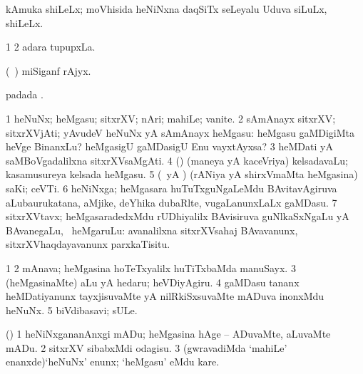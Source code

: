 {{{{{{\bentry
{} 
\gl{\nA}
\expl{}
\bmng
kAmuka shiLeLx; moVhisida heNiNxna daqSiTx seLeyalu Uduva siLuLx, shiLeLx. 
\emng
\eentry

\bentry
{} 
\gl{\nA}
\expl{}
\bmng
{} 
\emng
\eentry

\bentry
{} 
\gl{\nA}
\expl{}
\bmng
\bnum
\num{1}  
\num{2} adara tupupxLa. 
\enum
\emng
\eentry

\bentry
{} 
\gl{\nA}
\expl{}
\bmng
(\kanu\ \ame) miSiganf rAjyx. 
\emng
\eentry

\bentry
{} 
\gl{\nA}
\expl{}
\bmng
{} padada \bava. 
\emng
\eentry

\bentry
{} 
\gl{\nA}
\bmng
\bnum
\num{1} heNuNx; heMgasu; sitxrXV; nAri; mahiLe; vanite. 
\num{2} sAmAnayx sitxrXV; sitxrXVjAti; yAvudeV heNuNx yA sAmAnayx heMgasu:  heMgasu gaMDigiMta heVge BinanxLu? heMgasigU gaMDasigU Enu vayxtAyxsa? 
\num{3} heMDati yA saMBoVgadalilxna sitxrXVsaMgAti. 
\num{4} (\AmA) (maneya yA kaceVriya) kelsadavaLu; kasamusureya kelsada heMgasu. 
\num{5} (\ca\ yA \pArxparx) (rANiya yA shirxVmaMta heMgasina) saKi; ceVTi. 
\num{6} heNiNxga; heMgasara huTuTxguNgaLeMdu BAvitavAgiruva aLubaurukatana, aMjike, deYhika dubaRlte, \mo vugaLanunxLaLx gaMDasu. 
\num{7} sitxrXVtavx; heMgasaradedxMdu rUDhiyalilx BAvisiruva guNlkaSxNgaLu yA BAvanegaLu, \udA\ heMgaruLu:  avanalilxna sitxrXVsahaj BAvavanunx, sitxrXVhaqdayavanunx parxkaTisitu. 
\enum
\emng

\noindent
\gl{\pagu}
\expl{}
\bmng
\bnum
\num{1}  
\num{2}  mAnava; heMgasina hoTeTxyalilx huTiTxbaMda manuSayx. 
\num{3}  (heMgasinaMte) aLu yA hedaru; heVDiyAgiru. 
\num{4}  gaMDasu tananx heMDatiyanunx tayxjisuvaMte yA nilRkiSxsuvaMte mADuva inonxMdu heNuNx. 
\num{5}  biVdibasavi; sULe. 
\enum
\emng
\eentry

\bentry
{} 
\gl{\sakirx}
\expl{}
\bmng
(\pArxparx) 
\bnum
\num{1} heNiNxgananAnxgi mADu; heMgasina hAge -- ADuvaMte, aLuvaMte mADu. 
\num{2} sitxrXV sibabxMdi odagisu. 
\num{3} (gwravadiMda `mahiLe' enanxde)`heNuNx' enunx; `heMgasu' eMdu kare. 
\enum
\emng
\eentry

}}}}}}
